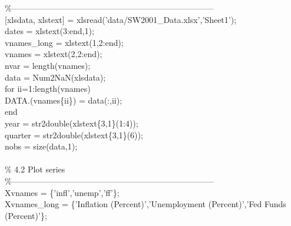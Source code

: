 \hspace{1mm}\textcolor{matlabgreen}{\%--------------------------------------------------------------------------  }\\ 
\hspace{1mm}[xlsdata, xlstext] = xlsread(\textcolor{matlabpurple}{'data/SW2001\_Data.xlsx'},\textcolor{matlabpurple}{'Sheet1'}); \\ 
\hspace{1mm}dates = xlstext(3:end,1); \\ 
\hspace{1mm}vnames\_long = xlstext(1,2:end); \\ 
\hspace{1mm}vnames = xlstext(2,2:end); \\ 
\hspace{1mm}nvar = length(vnames); \\ 
\hspace{1mm}data   = Num2NaN(xlsdata); \\ 
\hspace{1mm}\textcolor{matlabblue}{for} ii=1:length(vnames) \\ 
\hspace{1mm}\hspace{5mm} DATA.(vnames\{ii\}) = data(:,ii); \\ 
\hspace{1mm}\textcolor{matlabblue}{end} \\ 
\hspace{1mm}year = str2double(xlstext\{3,1\}(1:4)); \\ 
\hspace{1mm}quarter = str2double(xlstext\{3,1\}(6)); \\ 
\hspace{1mm}nobs = size(data,1); \\ 
\hspace{1mm} \\ 
\hspace{1mm}\textcolor{matlabgreen}{\% 4.2 Plot series }\\ 
\hspace{1mm}\textcolor{matlabgreen}{\%--------------------------------------------------------------------------  }\\ 
\hspace{1mm}Xvnames      = \{\textcolor{matlabpurple}{'infl'},\textcolor{matlabpurple}{'unemp'},\textcolor{matlabpurple}{'ff'}\}; \\ 
\hspace{1mm}Xvnames\_long = \{\textcolor{matlabpurple}{'Inflation (Percent)'},\textcolor{matlabpurple}{'Unemployment (Percent)'},\textcolor{matlabpurple}{'Fed Funds (Percent)'}\}; \\ 
